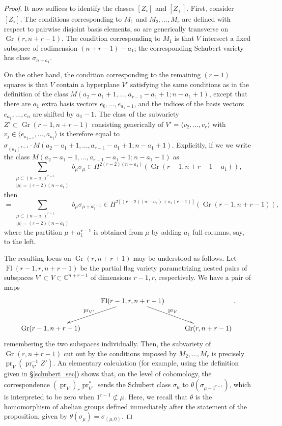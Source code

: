 \documentclass[11pt]{article}
\theoremstyle{definition}
\numberwithin{equation}{section}
\newcommand{\bC}{\mathbb{C}}
\DeclareMathOperator{\Fl}{Fl}
\DeclareMathOperator{\Gr}{Gr}
\DeclareMathOperator{\pr}{pr}
\begin{document}
\begin{proof}
It now suffices to identify the classes $[Z_\circ]$ and $[Z_+]$. First, consider $[Z_\circ]$. The conditions corresponding to $M_1$ and $M_2,\ldots,M_r$ are defined with respect to pairwise disjoint basis elements, so are generically transverse on $\Gr(r,n+r-1)$. The condition corresponding to $M_1$ is that $V$ intersect a fixed subspace of codimension $(n+r-1)-a_1$; the corresponding Schubert variety has class $\sigma_{n-a_1}$.

On the other hand, the condition corresponding to the remaining $(r-1)$ squares is that $V$ contain a hyperplane $V'$ satisfying the same conditions as in the definition of the class $M(a_2-a_1+1,\ldots,a_{r-1}-a_1+1;n-a_1+1)$, except that there are $a_1$ extra basis vectors $e_0,\ldots,e_{a_1-1}$, and the indices of the basis vectors $e_{a_1},\ldots,e_n$ are shifted by $a_1-1$. The class of the subvariety $Z'\subset \Gr(r-1,n+r-1)$ consisting generically of $V'=\langle v_2,\ldots,v_r\rangle$ with $v_j\in \langle e_{a_{j-1}},\ldots,a_{a_{j}}\rangle$ is therefore equal to $\sigma_{(a_1)^{r-1}}\cdot M(a_2-a_1+1,\ldots,a_{r-1}-a_1+1;n-a_1+1)$. Explicitly, if we we write the class $M(a_2-a_1+1,\ldots,a_{r-1}-a_1+1;n-a_1+1)$ as
\begin{equation*}
\sum_{\substack{\mu\subset(n-a_1)^{r-1} \\ |\mu|=(r-2)(n-a_1)}} b_\mu\sigma_\mu\in H^{2(r-2)(n-a_1)}(\Gr(r-1,n+r-1-a_1)),
\end{equation*}
then 
\begin{equation*}
[Z']=\sum_{\substack{\mu\subset(n-a_1)^{r-1} \\ |\mu|=(r-2)(n-a_1)}} b_\mu\sigma_{\mu+a_1^{r-1}}\in H^{2[(r-2)(n-a_1)+a_1(r-1)]}(\Gr(r-1,n+r-1)),
\end{equation*}
where the partition $\mu+a_1^{r-1}$ is obtained from $\mu$ by adding $a_1$ full columns, say, to the left.

The resulting locus on $\Gr(r,n+r+1)$ may be understood as follows. Let $\Fl(r-1,r,n+r-1)$ be the partial flag variety parametrizing nested pairs of subspaces $V'\subset V\subset \bC^{n+r-1}$ of dimensions $r-1,r$, respectively. We have a pair of maps
\begin{equation*}
\xymatrix{ & \Fl(r-1,r,n+r-1) \ar[ld]_{\pr_{V'}} \ar[rd]^{\pr_{V}} & \\
\Gr(r-1,n+r-1) & & \Gr(r,n+r-1)}.
\end{equation*}
remembering the two subspaces individually. Then, the subvariety of $\Gr(r,n+r-1)$ cut out by the conditions imposed by $M_2,\ldots,M_r$ is precisely $\pr_V(\pr_{V'}^{-1}Z')$. An elementary calculation (for example, using the definition given in \S\ref{schubert_sec}) shows that, on the level of cohomology, the correspondence $(\pr_V)_{*}\pr_{V'}^{*}$ sends the Schubert class $\sigma_\mu$ to $\theta(\sigma_{\mu-1^{r-1}})$, which is interpreted to be zero when $1^{r-1}\not\subset\mu$. Here, we recall that $\theta$ is the homomorphism of abelian groups defined immediately after the statement of the proposition, given by $\theta(\sigma_\mu)=\sigma_{(\mu,0)}$.


\end{proof}
\end{document}
